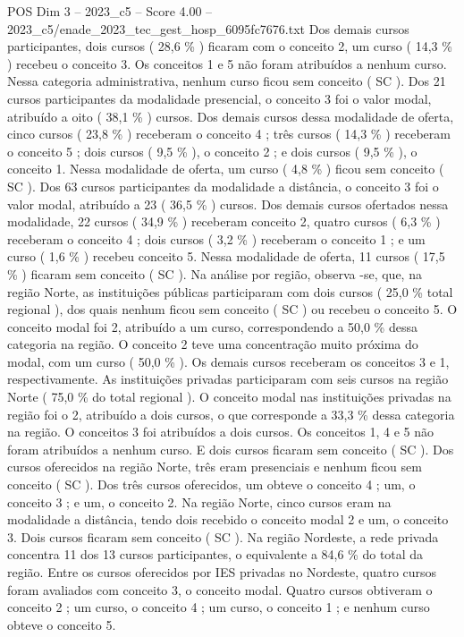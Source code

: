 \begin{textsample}{POS Dim 3 – 2023\_c5 – Score 4.00 – 2023\_c5/enade\_2023\_tec\_gest\_hosp\_6095fc7676.txt}
Dos demais cursos participantes, dois cursos ( 28,6 \% ) ficaram com o conceito 2, um curso ( 14,3 \% ) recebeu o conceito 3.
Os conceitos 1 e 5 não foram atribuídos a nenhum curso.
Nessa categoria administrativa, nenhum curso ficou sem conceito ( SC ).
Dos 21 cursos participantes da modalidade presencial, o conceito 3 foi o valor modal, atribuído a oito ( 38,1 \% ) cursos.
Dos demais cursos dessa modalidade de oferta, cinco cursos ( 23,8 \% ) receberam o conceito 4 ; três cursos ( 14,3 \% ) receberam o conceito 5 ; dois cursos ( 9,5 \% ), o conceito 2 ; e dois cursos ( 9,5 \% ), o conceito 1.
Nessa modalidade de oferta, um curso ( 4,8 \% ) ficou sem conceito ( SC ).
Dos 63 cursos participantes da modalidade a distância, o conceito 3 foi o valor modal, atribuído a 23 ( 36,5 \% ) cursos.
Dos demais cursos ofertados nessa modalidade, 22 cursos ( 34,9 \% ) receberam conceito 2, quatro cursos ( 6,3 \% ) receberam o conceito 4 ; dois cursos ( 3,2 \% ) receberam o conceito 1 ; e um curso ( 1,6 \% ) recebeu conceito 5.
Nessa modalidade de oferta, 11 cursos ( 17,5 \% ) ficaram sem conceito ( SC ).
Na análise por região, observa -se, que, na região Norte, as instituições públicas participaram com dois cursos ( 25,0 \% total regional ), dos quais nenhum ficou sem conceito ( SC ) ou recebeu o conceito 5.
O conceito modal foi 2, atribuído a um curso, correspondendo a 50,0 \% dessa categoria na região.
O conceito 2 teve uma concentração muito próxima do modal, com um curso ( 50,0 \% ).
Os demais cursos receberam os conceitos 3 e 1, respectivamente.
As instituições privadas participaram com seis cursos na região Norte ( 75,0 \% do total regional ).
O conceito modal nas instituições privadas na região foi o 2, atribuído a dois cursos, o que corresponde a 33,3 \% dessa categoria na região.
O conceitos 3 foi atribuídos a dois cursos.
Os conceitos 1, 4 e 5 não foram atribuídos a nenhum curso.
E dois cursos ficaram sem conceito ( SC ).
Dos cursos oferecidos na região Norte, três eram presenciais e nenhum ficou sem conceito ( SC ).
Dos três cursos oferecidos, um obteve o conceito 4 ; um, o conceito 3 ; e um, o conceito 2.
Na região Norte, cinco cursos eram na modalidade a distância, tendo dois recebido o conceito modal 2 e um, o conceito 3.
Dois cursos ficaram sem conceito ( SC ).
Na região Nordeste, a rede privada concentra 11 dos 13 cursos participantes, o equivalente a 84,6 \% do total da região.
Entre os cursos oferecidos por IES privadas no Nordeste, quatro cursos foram avaliados com conceito 3, o conceito modal.
Quatro cursos obtiveram o conceito 2 ; um curso, o conceito 4 ; um curso, o conceito 1 ; e nenhum curso obteve o conceito 5.

\end{textsample}
